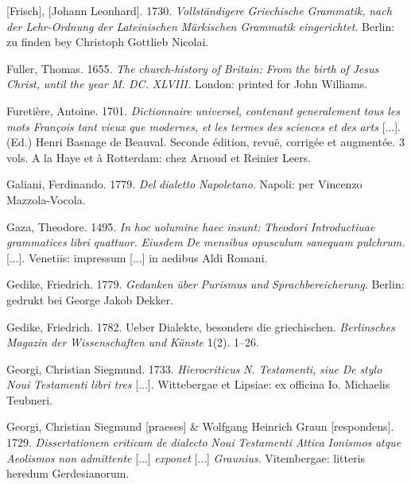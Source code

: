 \documentclass[output=paper]{langsci/langscibook}
\begin{document}
[Frisch], [Johann Leonhard]. 1730. \textit{Vollständigere} \textit{Griechische} \textit{Grammatik,} \textit{nach} \textit{der} \textit{Lehr-Ordnung} \textit{der} \textit{Lateinischen} \textit{Märkischen} \textit{Grammatik} \textit{eingerichtet}. Berlin: zu finden bey Christoph Gottlieb Nicolai.

Fuller, Thomas. 1655. \textit{The} \textit{church-history} \textit{of} \textit{Britain:} \textit{From} \textit{the} \textit{birth} \textit{of} \textit{Jesus} \textit{Christ,} \textit{until} \textit{the} \textit{year} \textit{M.} \textit{DC.} \textit{XLVIII.} London: printed for John Williams.

Furetière, Antoine. 1701. \textit{Dictionnaire} \textit{universel,} \textit{contenant} \textit{generalement} \textit{tous} \textit{les} \textit{mots} \textit{François} \textit{tant} \textit{vieux} \textit{que} \textit{modernes,} \textit{et} \textit{les} \textit{termes} \textit{des} \textit{sciences} \textit{et} \textit{des} \textit{arts} [...]. (Ed.) Henri Basnage de Beauval. Seconde édition, revuë, corrigée et augmentée. 3 vols. A la Haye et à Rotterdam: chez Arnoud et Reinier Leers.

Galiani, Ferdinando. 1779. \textit{Del} \textit{dialetto} \textit{Napoletano}. Napoli: per Vincenzo Mazzola-Vocola.

Gaza, Theodore. 1495. \textit{In} \textit{hoc} \textit{uolumine} \textit{haec} \textit{insunt:} \textit{Theodori} \textit{Introductiuae} \textit{grammatices} \textit{libri} \textit{quattuor.} \textit{Eiusdem} \textit{De} \textit{mensibus} \textit{opusculum} \textit{sanequam} \textit{pulchrum.} [...]. Venetiis: impressum [...] in aedibus Aldi Romani.

Gedike, Friedrich. 1779. \textit{Gedanken} \textit{über} \textit{Purismus} \textit{und} \textit{Sprachbereicherung}. Berlin: gedrukt bei George Jakob Dekker.

Gedike, Friedrich. 1782. Ueber Dialekte, besonders die griechischen. \textit{Berlinsches} \textit{Magazin} \textit{der} \textit{Wissenschaften} \textit{und} \textit{Künste} 1(2). 1–26.

Georgi, Christian Siegmund. 1733. \textit{Hierocriticus} \textit{N.} \textit{Testamenti,} \textit{siue} \textit{De} \textit{stylo} \textit{Noui} \textit{Testamenti} \textit{libri} \textit{tres} [...]. Wittebergae et Lipsiae: ex officina Io. Michaelis Teubneri.

Georgi, Christian Siegmund [praeses] \& Wolfgang Heinrich Graun [respondens]. 1729. \textit{Dissertationem} \textit{criticam} \textit{de} \textit{dialecto} \textit{Noui} \textit{Testamenti} \textit{Attica} \textit{Ionismos} \textit{atque} \textit{Aeolismos} \textit{non} \textit{admittente} [...] \textit{exponet} [...] \textit{Graunius}. Vitembergae: litteris heredum Gerdesianorum.
\end{document}
